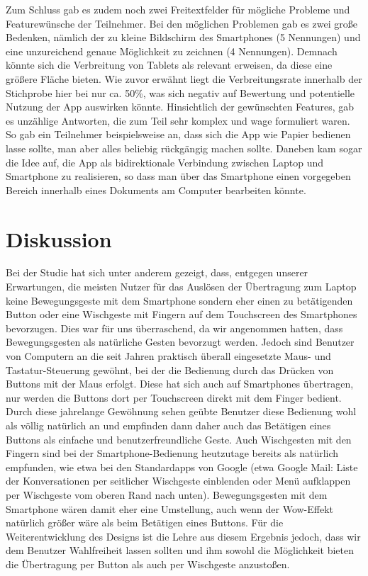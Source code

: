 \documentclass{chi-ext}
\begin{document}
Zum Schluss gab es zudem noch zwei Freitextfelder für mögliche Probleme und Featurewünsche der Teilnehmer. Bei den möglichen Problemen gab es zwei große Bedenken, nämlich der zu kleine Bildschirm des Smartphones (5 Nennungen) und eine unzureichend genaue Möglichkeit zu zeichnen (4 Nennungen). Demnach könnte sich die Verbreitung von Tablets als relevant erweisen, da diese eine größere Fläche bieten. Wie zuvor erwähnt liegt die Verbreitungsrate innerhalb der Stichprobe hier bei nur ca. 50\%, was sich negativ auf Bewertung und potentielle Nutzung der App auswirken könnte.
Hinsichtlich der gewünschten Features, gab es unzählige Antworten, die zum Teil sehr komplex und wage formuliert waren. So gab ein Teilnehmer beispielsweise an, dass sich die App wie Papier bedienen lasse sollte, man aber alles beliebig rückgängig machen sollte. Daneben kam sogar die Idee auf, die App als bidirektionale Verbindung zwischen Laptop und Smartphone zu realisieren, so dass man über das Smartphone einen vorgegeben Bereich innerhalb eines Dokuments am Computer bearbeiten könnte.


\section{Diskussion}
Bei der Studie hat sich unter anderem gezeigt, dass, entgegen unserer Erwartungen, die meisten Nutzer für das Auslösen der Übertragung zum Laptop keine Bewegungsgeste mit dem Smartphone sondern eher einen zu betätigenden Button oder eine Wischgeste mit Fingern auf dem Touchscreen des Smartphones bevorzugen. Dies war für uns überraschend, da wir angenommen hatten, dass Bewegungsgesten als natürliche Gesten bevorzugt werden. Jedoch sind Benutzer von Computern an die seit Jahren praktisch überall eingesetzte Maus- und Tastatur-Steuerung gewöhnt, bei der die Bedienung durch das Drücken von Buttons mit der Maus erfolgt. Diese hat sich auch auf Smartphones übertragen, nur werden die Buttons dort per Touchscreen direkt mit dem Finger bedient. Durch diese jahrelange Gewöhnung sehen geübte Benutzer diese Bedienung wohl als völlig natürlich an und empfinden dann daher auch das Betätigen eines Buttons als einfache und benutzerfreundliche Geste. Auch Wischgesten mit den Fingern sind bei der Smartphone-Bedienung heutzutage bereits als natürlich empfunden, wie etwa bei den Standardapps von Google (etwa Google Mail: Liste der Konversationen per seitlicher Wischgeste einblenden oder Menü aufklappen per Wischgeste vom oberen Rand nach unten).
Bewegungsgesten mit dem Smartphone wären damit eher eine Umstellung, auch wenn der Wow-Effekt natürlich größer wäre als beim Betätigen eines Buttons. Für die Weiterentwicklung des Designs ist die Lehre aus diesem Ergebnis jedoch, dass wir dem Benutzer Wahlfreiheit lassen sollten und ihm sowohl die Möglichkeit bieten die Übertragung per Button als auch per Wischgeste anzustoßen. 
\end{document}
